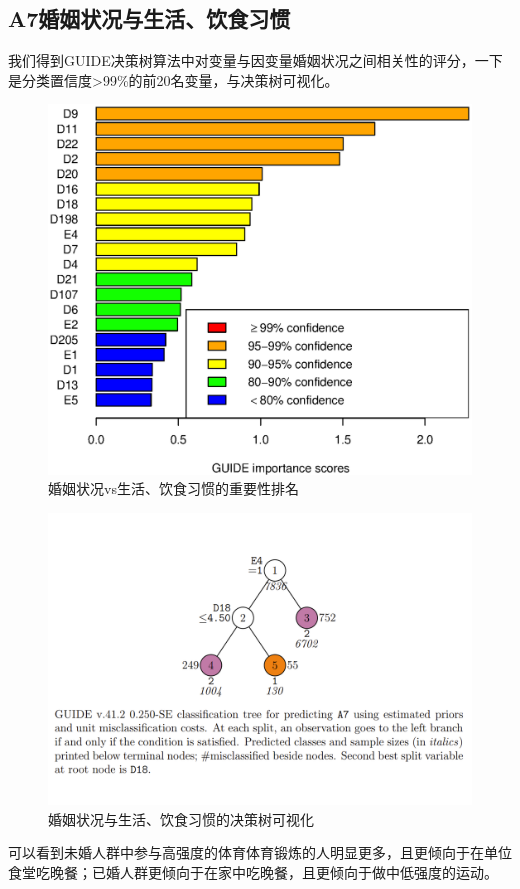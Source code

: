 \documentclass{article}
\begin{document}
\begin{CJK}{UTF8}{gbsn}
\subsection{A7婚姻状况与生活、饮食习惯}
我们得到GUIDE决策树算法中对变量与因变量婚姻状况之间相关性的评分，一下是分类置信度>99\%的前20名变量，与决策树可视化。
\begin{figure}[htbp]
    \flushleft
    \includegraphics[scale=0.7]{A7_imp.eps}
    \caption{婚姻状况vs生活、饮食习惯的重要性排名}
    \label{}
\end{figure}
\begin{figure}[htbp]
    \flushleft
    \includegraphics[scale=0.8]{A7_tree.png}
    \caption{婚姻状况与生活、饮食习惯的决策树可视化}
    \label{}
\end{figure}
可以看到未婚人群中参与高强度的体育体育锻炼的人明显更多，且更倾向于在单位食堂吃晚餐；已婚人群更倾向于在家中吃晚餐，且更倾向于做中低强度的运动。


\end{CJK}
\end{document}
